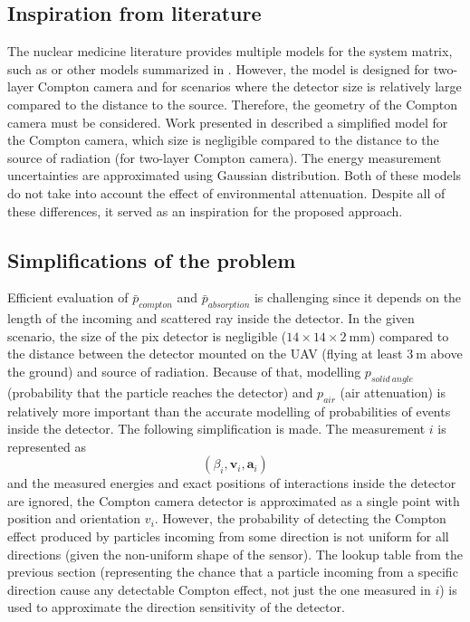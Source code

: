 \subsection{Inspiration from literature}
The nuclear medicine literature provides multiple models for the system matrix, such as \cite{wilderman} or other models summarized in \cite{yuemeng_feng}. 
However, the model is designed for two-layer Compton camera and for scenarios where the detector size is relatively large compared to the distance to the source. Therefore, the geometry of the Compton camera must be considered.
Work presented in \cite{maxim2016} described a simplified model for the Compton camera, which size is negligible compared to the distance to the source of radiation (for two-layer Compton camera).
The energy measurement uncertainties are approximated using Gaussian distribution.
Both of these models do not take into account the effect of environmental attenuation.
Despite all of these differences, it served as an inspiration for the proposed approach.

\subsection{Simplifications of the problem}
Efficient evaluation of $\bar{p}_{compton}$ and $\bar{p}_{absorption}$ is challenging since it depends on the length of the incoming and scattered ray inside the detector.
In the given scenario, the size of the \ac{pix} detector is negligible ($14 \times 14 \times 2 \ \mathrm{mm}$) compared to the distance between the detector mounted on the \ac{UAV} (flying at least $\SI{3}\meter$ above the ground) and source of radiation.
Because of that, modelling $p_{solid\ angle}$ (probability that the particle reaches the detector) and $p_{air}$ (air attenuation) is relatively more important than the accurate modelling of probabilities of events inside the detector.
The following simplification is made.
The measurement $i$ is represented as
\begin{equation}
  (\beta_{i}, \mathbf{v}_{i}, \mathbf{a}_{i})
\end{equation}
and the measured energies and exact positions of interactions inside the detector are ignored,
the Compton camera detector is approximated as a single point with position and orientation $v_{i}$.
However, the probability of detecting the Compton effect produced by particles incoming from some direction is not uniform for all directions (given the non-uniform shape of the sensor).
The lookup table from the previous section (representing the chance that a particle incoming from a specific direction cause any detectable Compton effect, not just the one measured in $i$) is used to approximate the direction sensitivity of the detector.

